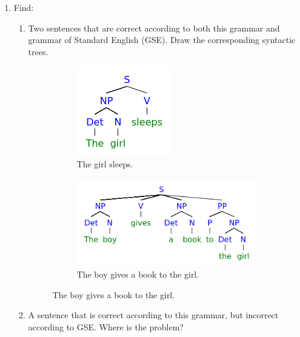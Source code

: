 \documentclass{article}
\begin{document}
\begin{enumerate}
	\item{Find:}
		\begin{enumerate}
			\item{Two sentences that are correct according to both this grammar
					and grammar of Standard English  (GSE). Draw the
					corresponding syntactic trees.}
						\begin{figure}[H]
							\begin{subfigure}[b]{0.3\linewidth}
								\centering
								\includegraphics[width=\linewidth]{2ai.png}
								\caption{The girl sleeps.}
								\label{fig:2ai}
							\end{subfigure}
							\hfill
							\begin{subfigure}[b]{0.6\linewidth}
								\centering
								\includegraphics[width=\linewidth]{2aii.png}
								\caption{The boy gives a book to the girl.}
								\label{fig:2aii}
							\end{subfigure}
							\label{fig:2a}
						\end{figure}
			\item{A sentence that is correct according to this grammar, but
				incorrect according to GSE. Where is the problem?}


\end{enumerate}
\end{enumerate}
\end{document}
